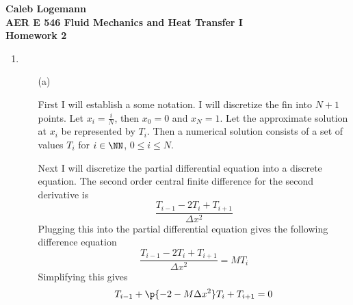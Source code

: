 \documentclass[11pt, oneside]{article}
\begin{document}
\noindent \textbf{\Large{Caleb Logemann \\
AER E 546 Fluid Mechanics and Heat Transfer I \\
Homework 2
}}

%
\begin{enumerate}
  \item %
    \begin{enumerate}
      \item[(a)]

        First I will establish a some notation.
        I will discretize the fin into $N + 1$ points.
        Let $x_i = \frac{i}{N}$, then $x_0 = 0$ and $x_N = 1$.
        Let the approximate solution at $x_i$ be represented by $T_i$.
        Then a numerical solution consists of a set of values $T_i$ for
        $i \in \NN$, $0 \le i \le N$.

        Next I will discretize the partial differential equation into a discrete
        equation.
        The second order central finite difference for the second derivative is
        \[
          \frac{T_{i - 1} - 2T_i + T_{i+1}}{\Delta x^2}
        \]
        Plugging this into the partial differential equation gives the following
        difference equation
        \[
          \frac{T_{i - 1} - 2T_i + T_{i+1}}{\Delta x^2} = MT_i
        \]
        Simplifying this gives
        \[
          T_{i - 1} + \p{- 2 - M\Delta x^2}T_i + T_{i+1} = 0
        \]


\end{enumerate}
\end{enumerate}
\end{document}
